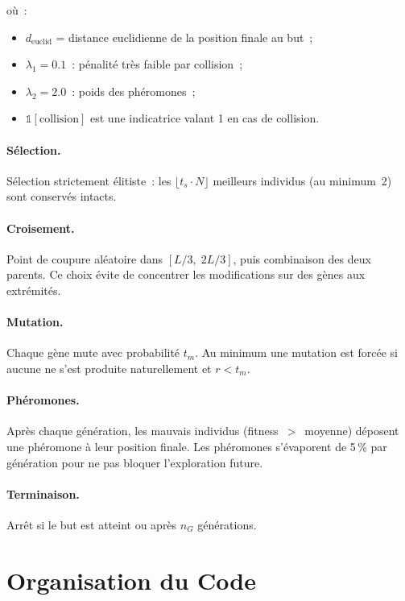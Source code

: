\documentclass[12pt, a4paper]{article}
\theoremstyle{definition}
\theoremstyle{remark}
\begin{document}
où~:
\begin{itemize}
    \item $d_{\text{euclid}}$ = distance euclidienne de la position finale au but~;
    \item $\lambda_1 = 0.1$~: pénalité très faible par collision~;
    \item $\lambda_2 = 2.0$~: poids des phéromones~;
    \item $\mathbb{1}[\text{collision}]$ est une indicatrice valant 1 en cas de
          collision.
\end{itemize}

\paragraph{Sélection.}
Sélection strictement élitiste~: les $\lfloor t_s \cdot N \rfloor$ meilleurs individus
(au minimum~2) sont conservés intacts.

\paragraph{Croisement.}
Point de coupure aléatoire dans $[L/3,\; 2L/3]$, puis combinaison des deux parents.
Ce choix évite de concentrer les modifications sur des gènes aux extrémités.

\paragraph{Mutation.}
Chaque gène mute avec probabilité $t_m$. Au minimum une mutation est forcée si
aucune ne s'est produite naturellement et $r < t_m$.

\paragraph{Phéromones.}
Après chaque génération, les mauvais individus (fitness~$>$~moyenne) déposent une
phéromone à leur position finale. Les phéromones s'évaporent de 5\,\% par
génération pour ne pas bloquer l'exploration future.

\paragraph{Terminaison.}
Arrêt si le but est atteint ou après $n_G$ générations.

\section{Organisation du Code}
\end{document}
